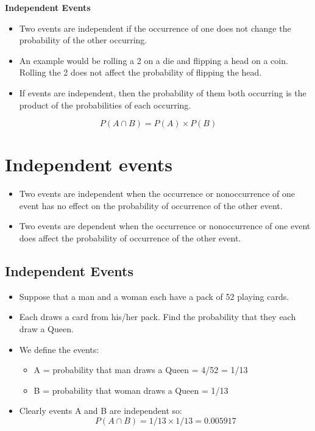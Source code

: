 \documentclass[]{report}
\begin{document}
\noindent \textbf{Independent Events}

\begin{itemize}
\item Two events are independent if the occurrence of one does not change the probability of the other occurring.
\item An example would be rolling a 2 on a die and flipping a head on a coin. Rolling the 2 does not affect the probability of flipping the head.
\item If events are independent, then the probability of them both occurring is the product of the probabilities of each occurring.
\end{itemize}
\[P(A \cap B) = P(A) \times P(B)\]



\section*{Independent events}

\begin{itemize}
\item Two events are independent when the occurrence or nonoccurrence of one event has no effect on the
probability of occurrence of the other event. 

\item Two events are dependent when the occurrence or nonoccurrence
of one event does affect the probability of occurrence of the other event.
\end{itemize}






\subsection{Independent Events}
\begin{itemize}
\item Suppose that a man and a woman each have a pack of 52 playing cards.
\item Each draws a card from his/her pack. Find the probability that they each draw a Queen.
\item We define the events:
\begin{itemize} \normalsize \item A = probability that man draws a Queen = 4/52  = 1/13
\item B = probability that woman draws a Queen = 1/13
\end{itemize} \item Clearly events A and B are independent so:
\[ P(A \cap B) = 1/13 \times 1/13 = 0.005917 \]
\end{itemize}
\end{document}
